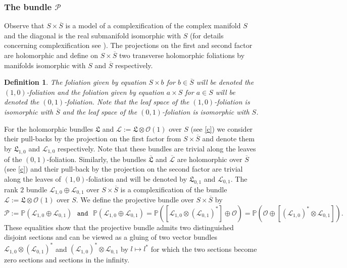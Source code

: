 \documentclass{amsart}
\newtheorem{defi}{Definition}[section]
\begin{document}
\subsubsection{The bundle $\mathcal{P}$}\label{p} Observe that $S\times \overline{S}$ is a model of a complexification of the complex manifold $S$ and the diagonal is the real submanifold isomorphic with $S$ (for details concerning complexification see \cite{BC}). The projections on the first and second factor are holomorphic and define  on $S\times \overline{S}$ two transverse holomorphic foliations by manifolds isomorphic with $S$ and $\overline{S}$ respectively. 
\begin{defi}
    The foliation given by equation $S\times{b}$ for $b\in\overline{S}$ will be denoted the $(1,0)$-foliation and the foliation given by equation $a\times S$ for $a\in S$ will be denoted the $(0,1)$-foliation. Note that the leaf space of the $(1,0)$-foliation is isomorphic with $\overline{S}$ and the leaf space of the $(0,1)$-foliation is isomorphic with $S$.
\end{defi}\label{fol}
For the holomorphic bundles $\mathfrak{L}$ and $\mathcal{L}:=\mathfrak{L}\otimes \mathcal{O}(1)$ over $S$ (see \ref{c}) we consider their pull-backs  by the  projection on the first factor from $S\times\overline{S}$ and denote them by $\mathfrak{L}_{1,0}$ and $\mathcal{L}_{1,0}$ respectively. Note that these bundles are trivial along the leaves of the $(0,1)$-foliation. Similarly,  the bundles $\overline{\mathfrak{L}}$ and  $\overline{\mathcal{L}}$ are holomorphic over $\overline{S}$ (see \ref{c}) and their pull-back  by the  projection on the second factor are trivial along the leaves of $(1,0)$-foliation and will be denoted by $\mathfrak{L}_{0,1}$ and $\mathcal{L}_{0,1}$. The rank $2$ bundle $\mathcal{L}_{1,0}\oplus\mathcal{L}_{0,1}$ over $S\times\overline{S}$ is a complexification of the bundle $\mathcal{L}:=\mathfrak{L}\otimes\mathcal{O}(1)$ over $S$. We define the projective bundle over $S\times\overline{S}$ by $$\mathcal{P}:=\mathbb{P}(\mathcal{L}_{1,0}\oplus\mathcal{L}_{0,1})\ \ \ 
\texttt{and} \ \ \ \mathbb{P}(\mathcal{L}_{1,0}\oplus\mathcal{L}_{0,1})=\mathbb{P}([\mathcal{L}_{1,0}\otimes(\mathcal{L}_{0,1})^*]\oplus\mathcal{O})=\mathbb{P}(\mathcal{O}\oplus[(\mathcal{L}_{1,0})^*\otimes\mathcal{L}_{0,1}]).$$
These equalities show that the projective bundle admits two distinguished disjoint sections and can be viewed as a gluing of two vector bundles $\mathcal{L}_{1,0}\otimes(\mathcal{L}_{0,1})^*$ and $(\mathcal{L}_{1,0})^*\otimes\mathcal{L}_{0,1} $ by $l\mapsto l^*$ for which the two sections become zero sections and sections in the infinity.
\end{document}
